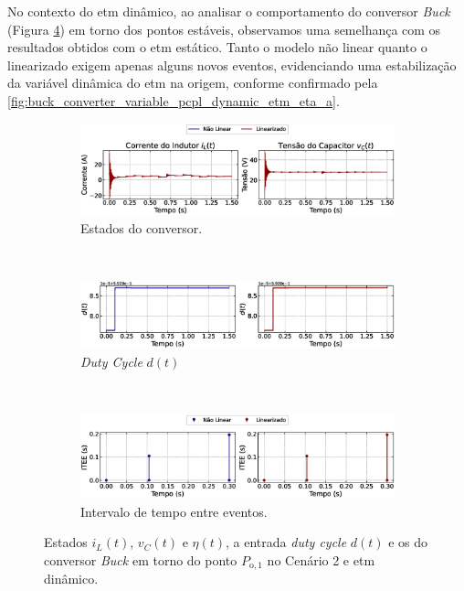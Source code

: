 No contexto do \acrshort{etm} dinâmico, ao analisar o comportamento do conversor \textit{Buck} (Figura \ref{fig:buck_converter_variable_pcpl_dynamic_etm_op1}) em torno dos pontos estáveis, observamos uma semelhança com os resultados obtidos com o \acrshort{etm} estático. Tanto o modelo não linear quanto o linearizado exigem apenas alguns novos eventos, evidenciando uma estabilização da variável dinâmica do \acrshort{etm} na origem, conforme confirmado pela \autoref{fig:buck_converter_variable_pcpl_dynamic_etm_eta_a}.

\begin{figure}[H]
  \centering
  \captionsetup{justification=centering}
  \begin{subfigure}{1.\textwidth}
    \centering
    \includegraphics[width=1.\textwidth]{figuras/dynamic-etm/buck/sim2/op1/result.eps}
    \caption{Estados do conversor.}
    \label{fig:buck_converter_variable_pcpl_dynamic_etm_op1_a}
  \end{subfigure}
  \\[6pt]
  \begin{subfigure}{1.\textwidth}
    \centering
    \includegraphics[width=1.\textwidth]{figuras/dynamic-etm/buck/sim2/op1/duty-cycle.eps}
    \caption{\textit{Duty Cycle} $d(t)$}
    \label{fig:buck_converter_variable_pcpl_dynamic_etm_op1_b}
  \end{subfigure}
  \\[6pt]
  \begin{subfigure}{1.\textwidth}
    \centering
    \includegraphics[width=1.\textwidth]{figuras/dynamic-etm/buck/sim2/op1/inter-event-times.eps}
    \caption{Intervalo de tempo entre eventos.}
    \label{fig:buck_converter_variable_pcpl_dynamic_etm_op1_c}
  \end{subfigure}
  \caption{Estados $i_L(t)$, $v_C(t)$ e $\eta(t)$, a entrada \textit{duty cycle} $d(t)$ e os  do conversor \textit{Buck} em torno do ponto $P_{\mathrm{o}, 1}$ no Cenário 2 e \acrshort{etm} dinâmico.}
  \label{fig:buck_converter_variable_pcpl_dynamic_etm_op1}
\end{figure}

